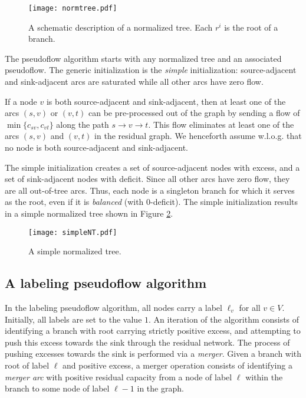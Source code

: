 \documentclass{article}
\begin{document}
\begin{figure}
\centerline{\texttt{[image: normtree.pdf]}}
\caption{\label{Figure:normtree}A schematic description of a normalized tree. Each $r^i$ is the root of a branch.}
\end{figure}

The pseudoflow algorithm starts with any normalized tree and an associated pseudoflow.  The generic initialization is the {\em simple} initialization: source-adjacent and sink-adjacent arcs are saturated while all other arcs have zero flow.

If a node $v$ is both source-adjacent and sink-adjacent, then at least one of the arcs $(s,v)$ or $(v,t)$ can be pre-processed out of the graph by sending a flow of $\min\{c_{sv}, c_{vt}\}$ along the path $s\rightarrow v \rightarrow t$. This flow eliminates at least one of the arcs $(s,v)$ and $(v,t)$ in the residual graph. We henceforth assume w.l.o.g. that no node is both source-adjacent and sink-adjacent.

The simple initialization creates a set of source-adjacent nodes with excess, and a set of sink-adjacent nodes with deficit.  Since all other arcs have zero flow, they are all out-of-tree arcs. Thus, each node is a singleton branch for which it serves as the root, even if it is {\em balanced} (with $0$-deficit). The simple initialization results in a simple normalized tree shown in Figure \ref{Figure:simpletree}.

\begin{figure}
\centerline{\texttt{[image: simpleNT.pdf]}}
\caption{\label{Figure:simpletree}A simple normalized tree.}
\end{figure}

\subsection{A labeling pseudoflow algorithm}
\label{Section:labelingalgo}

In the labeling pseudoflow algorithm, all nodes carry a label $\ell _v$ for all $v\in V$. Initially, all labels are set to the value $1$. An iteration of the algorithm consists of identifying a branch with root carrying strictly positive excess, and attempting to push this excess towards the sink through the residual network. The process of pushing excesses towards the sink is performed via a {\em merger}. Given a branch with root of label $\ell$ and positive excess, a merger operation consists of identifying a {\em merger arc} with positive residual capacity from a node of label $\ell$ within the branch to some node of label $\ell-1$ in the graph.
\end{document}
